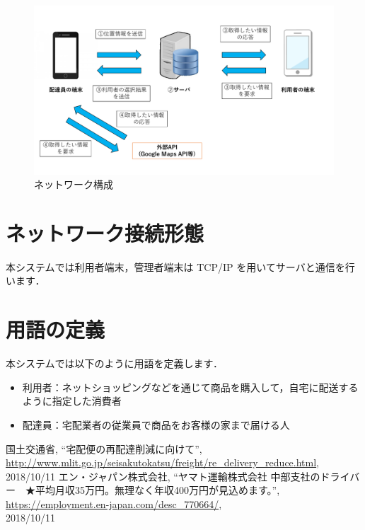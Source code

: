 \documentclass[a4j,titlepage]{jarticle}
\begin{document}
\begin{figure}[htbp]
 \begin{center}
  \includegraphics[width=140mm]{情報の流れ.pdf}
 \end{center}
 \caption{ネットワーク構成}
\end{figure}


\section{ネットワーク接続形態}
本システムでは利用者端末，管理者端末は TCP/IP を用いてサーバと通信を行います．


\section{用語の定義}
本システムでは以下のように用語を定義します．
\begin{itemize}
 \item 利用者：ネットショッピングなどを通じて商品を購入して，自宅に配送するように指定した消費者
 \item 配達員：宅配業者の従業員で商品をお客様の家まで届ける人
\end{itemize}

\begin{thebibliography}{9}

国土交通省,
\newblock ``宅配便の再配達削減に向けて'',\\
\newblock \url{http://www.mlit.go.jp/seisakutokatsu/freight/re_delivery_reduce.html}, \\
2018/10/11
エン・ジャパン株式会社,
\newblock ``ヤマト運輸株式会社 中部支社のドライバー　★平均月収35万円。無理なく年収400万円が見込めます。'',\\
\newblock \url{https://employment.en-japan.com/desc_770664/}, \\
2018/10/11
\end{thebibliography}
\end{document}
